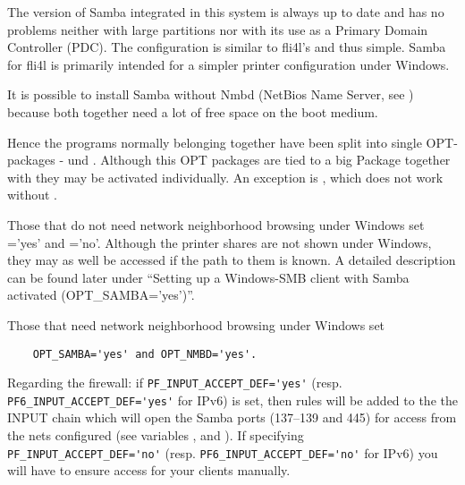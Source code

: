     The version of Samba integrated in this system is always up
    to date and has no problems neither with large partitions nor with
    its use as a Primary Domain Controller (PDC). The configuration is similar
    to fli4l's and thus simple. Samba for fli4l is primarily intended for a simpler
    printer configuration under Windows.

    It is possible to install Samba without Nmbd (NetBios Name Server, see )
    because both together need a lot of free space on the boot medium.

    Hence the programs normally belonging together have been split into single OPT-
    packages -  und .
    Although this OPT packages are tied to a big Package together with 
    they may be activated individually.
    An exception is , which does not work without .

    Those that do not need network neighborhood browsing under Windows set
    ='yes' and ='no'.
    Although the printer shares are not shown under Windows, they may as well be
    accessed if the path to them is known. A detailed description can be found later
    under ``Setting up a Windows-SMB client with Samba activated (OPT\_SAMBA='yes')''.

    Those that need network neighborhood browsing under Windows set
\begin{example}
\begin{verbatim}
    OPT_SAMBA='yes' and OPT_NMBD='yes'.
\end{verbatim}
\end{example}

    Regarding the firewall: if \verb+PF_INPUT_ACCEPT_DEF='yes'+ (resp.
    \verb+PF6_INPUT_ACCEPT_DEF='yes'+ for IPv6) is set, then rules will be added
    to the the INPUT chain which will open the Samba ports (137--139 and 445)
    for access from the nets configured (see variables
    ,
     and
    ). If specifying
    \verb+PF_INPUT_ACCEPT_DEF='no'+ (resp. \verb+PF6_INPUT_ACCEPT_DEF='no'+ for
    IPv6) you will have to ensure access for your clients manually.

